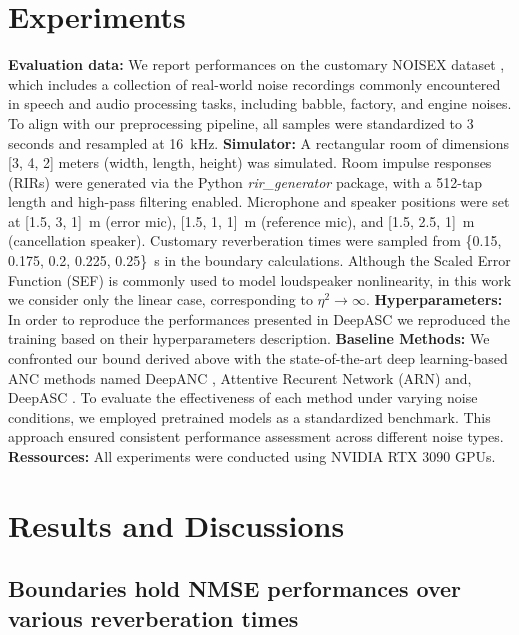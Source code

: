 \documentclass{article}
\begin{document}
\section{Experiments}
\textbf{Evaluation data:} We report performances on the customary NOISEX dataset \cite{varga1993assessment}, which includes a collection of real-world noise recordings commonly encountered in speech and audio processing tasks, including babble, factory, and engine noises. To align with our preprocessing pipeline, all samples were standardized to 3 seconds and resampled at 16~kHz.
\textbf{Simulator:} A rectangular room of dimensions [3, 4, 2] meters (width, length, height) was simulated. Room impulse responses (RIRs) were generated \citep{allen1979image} via the Python \textit{rir\_generator} package, with a 512-tap length and high-pass filtering enabled. Microphone and speaker positions were set at [1.5, 3, 1]~m (error mic), [1.5, 1, 1]~m (reference mic), and [1.5, 2.5, 1]~m (cancellation speaker). Customary reverberation times were sampled from \{0.15, 0.175, 0.2, 0.225, 0.25\}~s in the boundary calculations. Although the Scaled Error Function (SEF) \cite{tobias2006lms} is commonly used to model loudspeaker nonlinearity, in this work we consider only the linear case, corresponding to $\eta^2 \rightarrow \infty$. \textbf{Hyperparameters:} In order to reproduce the performances presented in DeepASC \cite{mishaly2025deepactivespeechcancellation} we reproduced the training based on their hyperparameters description. 
\textbf{Baseline Methods:} We confronted our bound derived above with the state-of-the-art deep learning-based ANC methods named DeepANC \cite{zhang2021deep}, Attentive Recurent Network (ARN) \cite{zhang2023deep} and, DeepASC \cite{mishaly2025deepactivespeechcancellation}. To evaluate the effectiveness of each method under varying noise conditions, we employed pretrained models as a standardized benchmark. This approach ensured consistent performance assessment across different noise types. \textbf{Ressources:} All experiments were conducted using NVIDIA RTX 3090 GPUs.

\section{Results and Discussions}


\subsection{Boundaries hold NMSE performances over various reverberation times}
\end{document}
